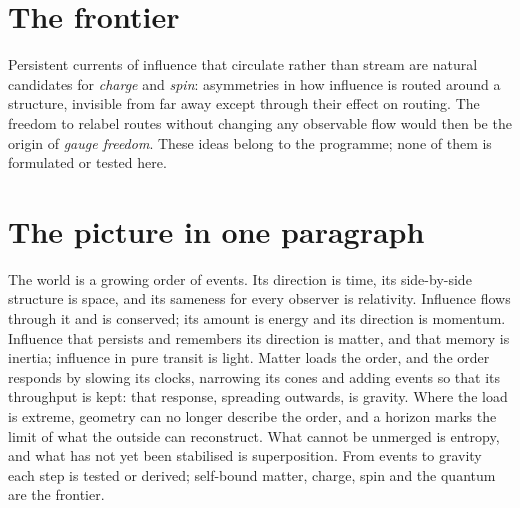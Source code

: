 \section{The frontier}\label{sec:onto-missing}

Persistent currents of influence that circulate rather than stream are natural candidates for
\emph{charge} and \emph{spin}: asymmetries in how influence is routed around a structure, invisible from
far away except through their effect on routing. The freedom to relabel routes without changing any
observable flow would then be the origin of \emph{gauge freedom}. These ideas belong to the programme;
none of them is formulated or tested here. 

\section{The picture in one paragraph}\label{sec:onto-summary}

The world is a growing order of events. Its direction is time, its side-by-side structure is space,
and its sameness for every observer is relativity. Influence flows through it and is conserved; its
amount is energy and its direction is momentum. Influence that persists and remembers its direction is
matter, and that memory is inertia; influence in pure transit is light. Matter loads the order, and
the order responds by slowing its clocks, narrowing its cones and adding events so that its throughput
is kept: that response, spreading outwards, is gravity. Where the load is extreme, geometry can no
longer describe the order, and a horizon marks the limit of what the outside can reconstruct. What
cannot be unmerged is entropy, and what has not yet been stabilised is superposition. From events to
gravity each step is tested or derived; self-bound matter, charge, spin and the quantum are the
frontier.
